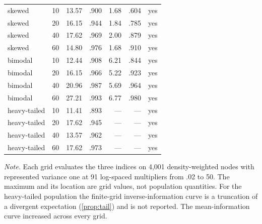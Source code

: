 \begin{table}[!htbp]
\begin{tabular}{llrrrrr}
skewed & 10 & 13.57 & .900 & 1.68 & .604 & yes \\
skewed & 20 & 16.15 & .944 & 1.84 & .785 & yes \\
skewed & 40 & 17.62 & .969 & 2.00 & .879 & yes \\
skewed & 60 & 14.80 & .976 & 1.68 & .910 & yes \\
bimodal & 10 & 12.44 & .908 & 6.21 & .844 & yes \\
bimodal & 20 & 16.15 & .966 & 5.22 & .923 & yes \\
bimodal & 40 & 20.96 & .987 & 5.69 & .964 & yes \\
bimodal & 60 & 27.21 & .993 & 6.77 & .980 & yes \\
heavy-tailed & 10 & 11.41 & .893 & --- & --- & yes \\
heavy-tailed & 20 & 17.62 & .945 & --- & --- & yes \\
heavy-tailed & 40 & 13.57 & .962 & --- & --- & yes \\
heavy-tailed & 60 & 17.62 & .973 & --- & --- & yes \\
\bottomrule
\end{tabular}

\smallskip
\begin{minipage}{0.95\textwidth}
\footnotesize
\emph{Note.} Each grid evaluates the three indices on 4,001 density-weighted nodes with represented variance one at 91 log-spaced multipliers from .02 to 50. The maximum and its location are grid values, not population quantities. For the heavy-tailed population the finite-grid inverse-information curve is a truncation of a divergent expectation (\cref{prop:tail}) and is not reported. The mean-information curve increased across every grid.
\end{minipage}
\end{table}
